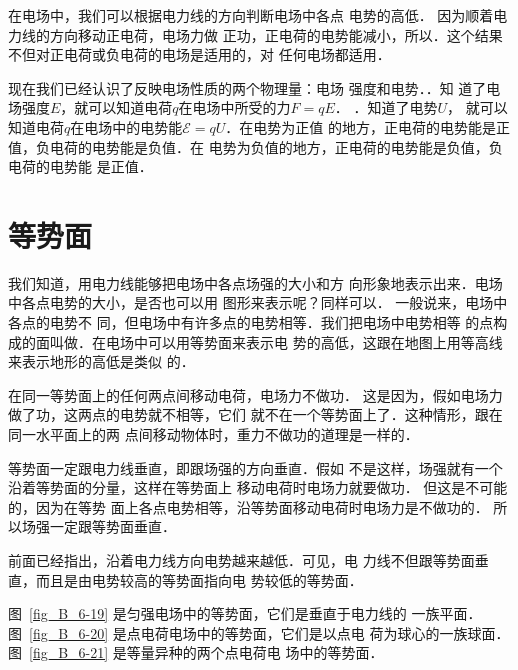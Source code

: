 在电场中，我们可以根据电力线的方向判断电场中各点
电势的高低．
因为顺着电力线的方向移动正电荷，电场力做
正功，正电荷的电势能减小，所以．这个结果不但对正电荷或负电荷的电场是适用的，对
任何电场都适用．

现在我们已经认识了反映电场性质的两个物理量：电场
强度和电势．．知
道了电场强度$E$，就可以知道电荷$q$在电场中所受的力$F=qE$．
．知道了电势$U$，
就可以知道电荷$q$在电场中的电势能$\mathcal{E}=qU$．在电势为正值
的地方，正电荷的电势能是正值，负电荷的电势能是负值．在
电势为负值的地方，正电荷的电势能是负值，负电荷的电势能
是正值．

\section{等势面}

我们知道，用电力线能够把电场中各点场强的大小和方
向形象地表示出来．电场中各点电势的大小，是否也可以用
图形来表示呢？同样可以．
一般说来，电场中各点的电势不
同，但电场中有许多点的电势相等．我们把电场中电势相等
的点构成的面叫做．在电场中可以用等势面来表示电
势的高低，这跟在地图上用等高线来表示地形的高低是类似
的．

在同一等势面上的任何两点间移动电荷，电场力不做功．
这是因为，假如电场力做了功，这两点的电势就不相等，它们
就不在一个等势面上了．这种情形，跟在同一水平面上的两
点间移动物体时，重力不做功的道理是一样的．

等势面一定跟电力线垂直，即跟场强的方向垂直．假如
不是这样，场强就有一个沿着等势面的分量，这样在等势面上
移动电荷时电场力就要做功．
但这是不可能的，因为在等势
面上各点电势相等，沿等势面移动电荷时电场力是不做功的．
所以场强一定跟等势面垂直．

前面已经指出，沿着电力线方向电势越来越低．可见，电
力线不但跟等势面垂直，而且是由电势较高的等势面指向电
势较低的等势面．




图~\ref{fig_B_6-19} 是匀强电场中的等势面，它们是垂直于电力线的
一族平面．图~\ref{fig_B_6-20} 是点电荷电场中的等势面，它们是以点电
荷为球心的一族球面．图~\ref{fig_B_6-21} 是等量异种的两个点电荷电
场中的等势面．

